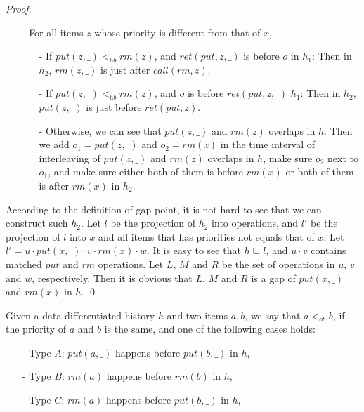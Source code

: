 \documentclass{llncs}
\begin{document}
\begin {proof}
\begin{itemize}
\item[-] For all items $z$ whose priority is different from that of $x$,

    \begin{itemize}
    \setlength{\itemsep}{0.5pt}

    \item[-] If $\textit{put}(z,\_) <_{\textit{hb}} \textit{rm}(z)$, and $\textit{ret}(\textit{put},z,\_)$ is before $o$ in $h_1$: Then in $h_2$, $\textit{rm}(z,\_)$ is just after $\textit{call}(\textit{rm},z)$.

    \item[-] If $\textit{put}(z,\_) <_{\textit{hb}} \textit{rm}(z)$, and $o$ is before $\textit{ret}(\textit{put},z,\_)$ $h_1$: Then in $h_2$, $\textit{put}(z,\_)$ is just before $\textit{ret}(\textit{put},z)$.

    \item[-] Otherwise, we can see that $\textit{put}(z,\_)$ and $\textit{rm}(z)$ overlaps in $h$. Then we add $o_1=\textit{put}(z,\_)$ and $o_2=\textit{rm}(z)$ in the time interval of interleaving of $\textit{put}(z,\_)$ and $\textit{rm}(z)$ overlaps in $h$, make sure $o_2$ next to $o_1$, and make sure either both of them is before $\textit{rm}(x)$ or both of them is after $\textit{rm}(x)$ in $h_2$.
    \end{itemize}
\end{itemize}

According to the definition of gap-point, it is not hard to see that we can construct such $h_2$. Let $l$ be the projection of $h_2$ into operations, and $l'$ be the projection of $l$ into $x$ and all items that has priorities not equals that of $x$. Let $l'= u \cdot \textit{put}(x,\_) \cdot v \cdot \textit{rm}(x) \cdot w$. It is easy to see that $h \sqsubseteq l$, and $u \cdot v$ contains matched $\textit{put}$ and $\textit{rm}$ operations. Let $L$, $M$ and $R$ be the set of operations in $u$, $v$ and $w$, respectively. Then it is obvious that $L$, $M$ and $R$ is a gap of $\textit{put}(x,\_)$ and $\textit{rm}(x)$ in $h$. \qed
\end {proof}

Given a data-differentiated history $h$ and two items $a,b$, we say that $a <_{\textit{ob}} b$, if the priority of $a$ and $b$ is the same, and one of the following cases holds:

\begin{itemize}
\setlength{\itemsep}{0.5pt}
\item[-] Type $A$: $\textit{put}(a,\_)$ happens before $\textit{put}(b,\_)$ in $h$,

\item[-] Type $B$: $\textit{rm}(a)$ happens before $\textit{rm}(b)$ in $h$,

\item[-] Type $C$: $\textit{rm}(a)$ happens before $\textit{put}(b,\_)$ in $h$,
\end{itemize}
\end{document}
